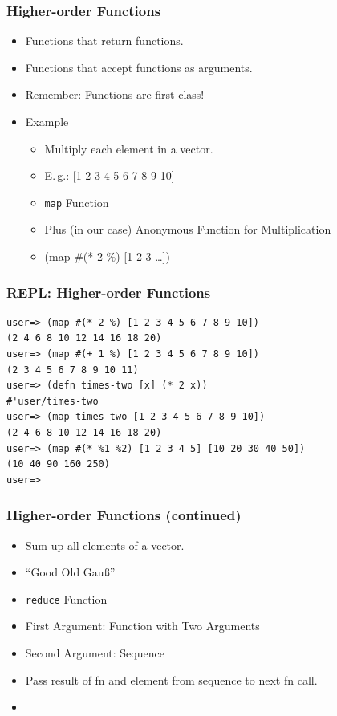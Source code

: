 \documentclass{beamer}
\begin{document}
  \begin{frame}
      \frametitle{Higher-order Functions}

      \begin{itemize}
          \item Functions that return functions.
          \item Functions that accept functions as arguments.
          \item Remember: Functions are first-class!
          \item Example
              \begin{itemize}
                  \item Multiply each element in a vector.
                  \item E.\,g.: [1 2 3 4 5 6 7 8 9 10]
                  \item \texttt{map} Function
                  \item Plus (in our case) Anonymous Function for Multiplication
                  \item (map \#(* 2 \%) [1 2 3 \ldots])
              \end{itemize}
      \end{itemize}
  \end{frame}

\begin{frame}[fragile]
\frametitle{REPL: Higher-order Functions}
\begin{lstlisting}[basicstyle=\scriptsize]
user=> (map #(* 2 %) [1 2 3 4 5 6 7 8 9 10])
(2 4 6 8 10 12 14 16 18 20)
user=> (map #(+ 1 %) [1 2 3 4 5 6 7 8 9 10])
(2 3 4 5 6 7 8 9 10 11)
user=> (defn times-two [x] (* 2 x))
#'user/times-two
user=> (map times-two [1 2 3 4 5 6 7 8 9 10])
(2 4 6 8 10 12 14 16 18 20)
user=> (map #(* %1 %2) [1 2 3 4 5] [10 20 30 40 50])
(10 40 90 160 250)
user=>  
\end{lstlisting}
\end{frame}

  \begin{frame}
      \frametitle{Higher-order Functions (continued)}

      \begin{itemize}
          \item Sum up all elements of a vector.
          \item ``Good Old Gauß''
          \item \texttt{reduce} Function
          \item First Argument: Function with Two Arguments
          \item Second Argument: Sequence
          \item Pass result of fn and element from sequence to next fn call.
          \item 
      \end{itemize}
  \end{frame}
\end{document}
